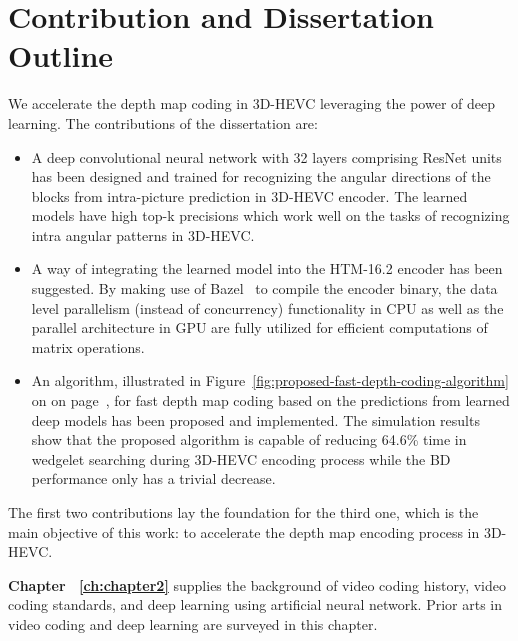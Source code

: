 \section{Contribution and Dissertation Outline}\label{sec:outline}
We accelerate the depth map coding in 3D-HEVC leveraging the power of
deep learning.
The contributions of the dissertation are:
\begin{itemize}
  \item A deep convolutional neural network with 32 layers comprising ResNet
  units~\parencite{RN67} has been designed and trained for recognizing the
  angular directions of the blocks from intra-picture prediction in 3D-HEVC
  encoder.
  The learned models have high top-k precisions which work well on the
  tasks of recognizing intra angular patterns in 3D-HEVC.
  \item A way of integrating the learned model into the HTM-16.2 encoder has
  been suggested.
  By making use of Bazel~\parencite{RN200} to compile the encoder binary, the
  data level parallelism (instead of concurrency) functionality in CPU
  as well as the parallel architecture in GPU are fully utilized for
  efficient computations of matrix operations.
  \item An algorithm, illustrated in
  Figure~\ref{fig:proposed-fast-depth-coding-algorithm} on on
  page~\pageref{fig:proposed-fast-depth-coding-algorithm}, for fast
  depth map coding based
  on the predictions from
  learned deep models has been proposed and implemented.
  The simulation results show that the proposed algorithm is capable of
  reducing 64.6\% time in wedgelet searching during 3D-HEVC encoding process
  while the BD performance only has a trivial decrease.
\end{itemize}
The first two contributions lay the foundation for the third one, which is the
main objective of this work: to accelerate the depth map encoding process in
3D-HEVC.

\textbf{Chapter ~\ref{ch:chapter2}} supplies the background of video
coding history, video coding standards, and deep learning using artificial
neural network.
Prior arts in video coding and deep learning are surveyed in this chapter.

